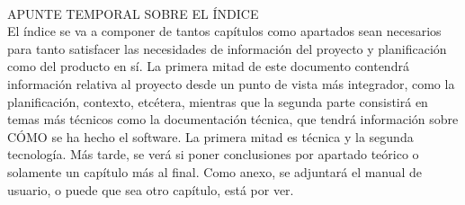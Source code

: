 \documentclass[12pt]{report}
\begin{document}
	\newpage 
	\thispagestyle{empty}
	$\,$
	
	
	\newpage
	{\LARGE APUNTE TEMPORAL SOBRE EL ÍNDICE} \\
	El índice se va a componer de tantos capítulos como apartados sean necesarios para tanto satisfacer las necesidades de información del proyecto y planificación como del producto en sí.
	La primera mitad de este documento contendrá información relativa al proyecto desde un punto de vista más integrador, como la planificación, contexto, etcétera, mientras que la segunda parte consistirá en temas más técnicos como la documentación técnica, que tendrá información sobre CÓMO se ha hecho el software. La primera mitad es técnica y la segunda tecnología. Más tarde, se verá si poner conclusiones por apartado teórico o solamente un capítulo más al final. Como anexo, se adjuntará el manual de usuario, o puede que sea otro capítulo, está por ver.
	
	\tableofcontents
	
	\listoffigures
	\listoftables
	
	
	
	
	
	
	\printbibliography[heading=bibintoc, title={Bibliografía}]
\end{document}
